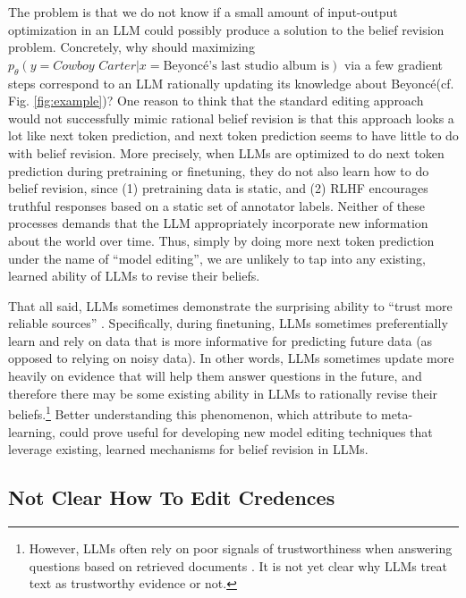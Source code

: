 \documentclass[11pt,a4paper]{article}
\newcommand{\beyonce}{Beyonc\'{e}\xspace}
\begin{document}
The problem is that we do not know if a small amount of input-output optimization in an LLM could possibly produce a solution to the belief revision problem. Concretely, why should maximizing $p_\theta(y=\textit{Cowboy Carter}|x=\textrm{\beyonce's last studio album is})$ via a few gradient steps correspond to an LLM rationally updating its knowledge about \beyonce (cf. Fig. \ref{fig:example})?
One reason to think that the standard editing approach would not successfully mimic rational belief revision is that this approach looks a lot like next token prediction, and next token prediction seems to have little to do with belief revision.
More precisely, when LLMs are optimized to do next token prediction during pretraining or finetuning, they do not also learn how to do belief revision, since (1) pretraining data is static, and (2) RLHF encourages truthful responses based on a static set of annotator labels. Neither of these processes demands that the LLM appropriately incorporate new information about the world over time. 
Thus, simply by doing more next token prediction under the name of ``model editing'', we are unlikely to tap into any existing, learned ability of LLMs to revise their beliefs.

That all said, LLMs sometimes demonstrate the surprising ability to ``trust more reliable sources'' \citep{krasheninnikov2024implicit}. Specifically, during finetuning, LLMs sometimes preferentially learn and rely on data that is more informative for predicting future data (as opposed to relying on noisy data). 
In other words, LLMs sometimes update more heavily on evidence that will help them answer questions in the future, and therefore there may be some existing ability in LLMs to rationally revise their beliefs.\footnote{However, LLMs often rely on poor signals of trustworthiness when answering questions based on retrieved documents \citep{wan2024evidence}. It is not yet clear why LLMs treat text as trustworthy evidence or not.} 
Better understanding this phenomenon, which \citet{krasheninnikov2024implicit} attribute to meta-learning, could prove useful for developing new model editing techniques that leverage existing, learned mechanisms for belief revision in LLMs. 

\subsection{Not Clear How To Edit Credences}
\label{sec:uncertainty_expression}
\end{document}
